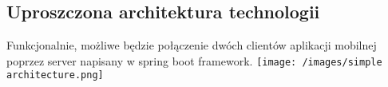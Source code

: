 \subsection{Uproszczona architektura technologii}
\tab Funkcjonalnie, możliwe będzie połączenie dwóch clientów aplikacji mobilnej poprzez server napisany w spring boot framework.
\texttt{[image: /images/simple architecture.png]}